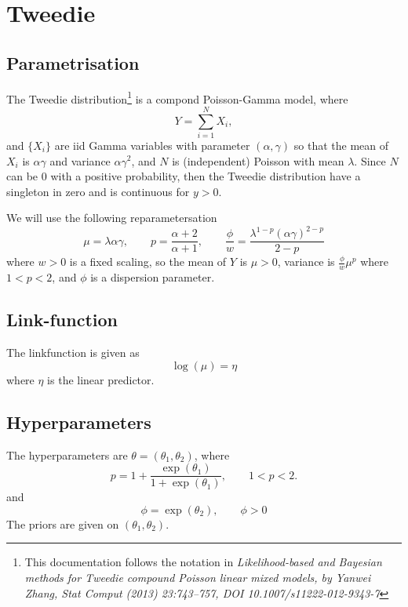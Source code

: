 \documentclass[a4paper,11pt]{article}
\begin{document}
\section*{Tweedie}

\subsection*{Parametrisation}

The Tweedie distribution\footnote{This documentation follows the
    notation in \emph{ Likelihood-based and Bayesian methods for
        Tweedie compound Poisson linear mixed models, by Yanwei Zhang,
        Stat Comput (2013) 23:743–757, DOI 10.1007/s11222-012-9343-7}}
is a compond Poisson-Gamma model, where
\begin{displaymath}
    Y = \sum_{i=1}^{N} X_i,
\end{displaymath}
and $\{X_i\}$ are iid Gamma variables with parameter
$(\alpha, \gamma)$ so that the mean of $X_i$ is $\alpha\gamma$ and
variance $\alpha\gamma^{2}$, and $N$ is (independent) Poisson with
mean $\lambda$. Since $N$ can be $0$ with a positive probability, then
the Tweedie distribution have a singleton in zero and is continuous
for $y>0$.

We will use the following reparametersation
\begin{displaymath}
    \mu = \lambda \alpha \gamma,\qquad
    p = \frac{\alpha+2}{\alpha+1},\qquad
    \frac{\phi}{w} = \frac{\lambda^{1-p} (\alpha\gamma)^{2-p}}{2-p}
\end{displaymath}
where $w>0$ is a fixed scaling, so the mean of $Y$ is $\mu>0$,
variance is $\frac{\phi}{w} \mu^{p}$ where $1<p<2$, and $\phi$ is a
dispersion parameter.

\subsection*{Link-function}

The linkfunction is given as 
\begin{displaymath}
    \log(\mu) =  \eta
\end{displaymath}
where $\eta$  is the linear predictor.

\subsection*{Hyperparameters}

The hyperparameters are ${\theta}=(\theta_1,\theta_2)$, where
\begin{displaymath}
    p=1 + \frac{\exp(\theta_1)}{1+\exp(\theta_1)}, \qquad 1<p<2.
\end{displaymath}
and
\begin{displaymath}
    \phi=\exp(\theta_2), \qquad \phi>0
\end{displaymath}
The priors are given on $(\theta_1,\theta_2)$.
\end{document}
